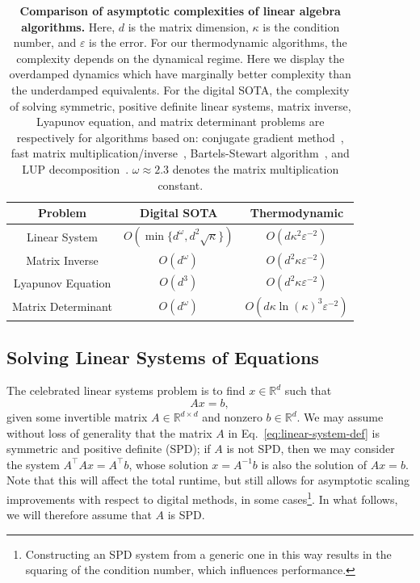 \documentclass[prx,onecolumn,floatfix,longbibliography,notitlepage, nofootinbib,12pt]{revtex4-2}
\begin{document}
\begin{table}[t]
    \centering
    \renewcommand{\arraystretch}{2}
    \begin{tabular}{c|c|c}
        \textbf{Problem} & \textbf{Digital SOTA}  
        & \textbf{Thermodynamic}  \\
        \hline
        Linear System &$O(\min\{d^\omega,d^2 \sqrt{\kappa}\})$ & $O( d \kappa^2\varepsilon^{-2})$\\
        Matrix Inverse &  $O(d^\omega)$  & $O( d^2 \kappa \varepsilon^{-2})$\\
        Lyapunov Equation &$O(d^3)$ &   $O( d^2 \kappa \varepsilon^{-2})$ \\
        Matrix Determinant & $O(d^\omega)$ &   $O(d \kappa  \ln(\kappa)^3 \varepsilon^{-2})$\\
    \end{tabular}
    \caption{\textbf{Comparison of asymptotic complexities of linear algebra algorithms.} Here, $d$ is the matrix dimension, $\kappa$ is the condition number, and $\varepsilon$ is the error. For our thermodynamic algorithms, the complexity depends on the dynamical regime. Here we display the overdamped dynamics which have marginally better complexity than the underdamped equivalents. For the digital SOTA, the complexity of solving symmetric, positive definite linear systems, matrix inverse, Lyapunov equation, and matrix determinant problems are respectively for algorithms based on: conjugate gradient method~\cite{shewchuk1994introduction}, fast matrix multiplication/inverse~\cite{robinson2005toward}, Bartels-Stewart algorithm~\cite{bartels1972solution}, and LUP decomposition~\cite{aho1974design}. $\omega\approx 2.3$ denotes the matrix multiplication constant.}
    \label{tab:runtime_scaling}
\end{table}






\subsection{Solving Linear Systems of Equations}\label{sec:linear_sys}




The celebrated linear systems problem is to find $x \in \mathbb{R}^d$ such that
\begin{equation}
\label{eq:linear-system-def}
    A x = b,
\end{equation}
given some invertible matrix $A \in \mathbb{R}^{d \times d}$ and nonzero $b \in \mathbb{R}^d$. We may assume without loss of generality that the matrix $A$ in Eq.~\eqref{eq:linear-system-def} is symmetric and positive definite (SPD); if $A$ is not SPD, then we may consider the system $A^\intercal A x = A^\intercal b$, whose solution $x=A^{-1} b$ is also the solution of $A x = b$. Note that this will affect the total runtime, but still allows for asymptotic scaling improvements with respect to digital methods, in some cases\footnote{Constructing an SPD system from a generic one in this way results in the squaring of the condition number, which influences performance.}. In what follows, we will therefore assume that $A$ is SPD.
\end{document}
